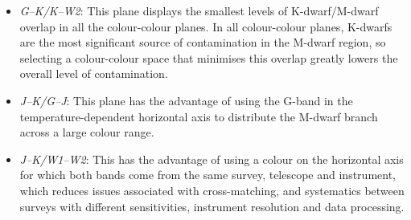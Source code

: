 \begin{itemize}
\item{{\em G--K/K--W2}: This plane displays the smallest levels of K-dwarf/M-dwarf overlap in all the colour-colour planes. In all colour-colour planes, K-dwarfs are the most significant source of contamination in the M-dwarf region, so selecting a colour-colour space that minimises this overlap greatly lowers the overall level of contamination.}
\item{{\em J--K/G--J}:  This plane has the advantage of using the G-band in the temperature-dependent horizontal axis to distribute the M-dwarf branch across a large colour range.}
\item{{\em J--K/W1--W2}: This has the advantage of using a colour on the horizontal axis for which both bands come from the same survey, telescope and instrument, which reduces issues associated with cross-matching, and systematics between surveys with different sensitivities, instrument resolution and data processing.}
\end{itemize}

